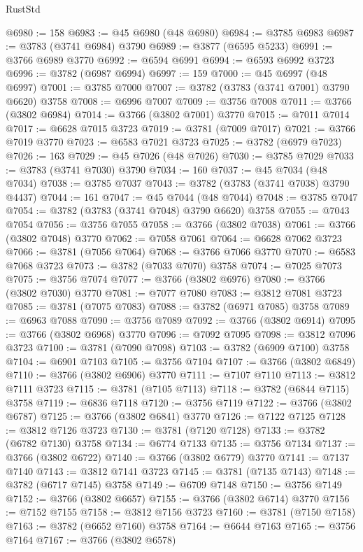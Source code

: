 \begin{lexlean}{RustStd}
\begin{coremodule}
@6980 := 158
@6983 := @45 @6980 (@48 @6980)
@6984 := @3785 @6983
@6987 := @3783 (@3741 @6984) @3790
@6989 := @3877 (@6595 @5233)
@6991 := @3766 @6989 @3770
@6992 := @6594 @6991
@6994 := @6593 @6992 @3723
@6996 := @3782 (@6987 @6994)
@6997 := 159
@7000 := @45 @6997 (@48 @6997)
@7001 := @3785 @7000
@7007 := @3782 (@3783 (@3741 @7001) @3790 @6620) @3758
@7008 := @6996 @7007
@7009 := @3756 @7008
@7011 := @3766 (@3802 @6984)
@7014 := @3766 (@3802 @7001) @3770
@7015 := @7011 @7014
@7017 := @6628 @7015 @3723
@7019 := @3781 (@7009 @7017)
@7021 := @3766 @7019 @3770
@7023 := @6583 @7021 @3723
@7025 := @3782 (@6979 @7023)
@7026 := 163
@7029 := @45 @7026 (@48 @7026)
@7030 := @3785 @7029
@7033 := @3783 (@3741 @7030) @3790
@7034 := 160
@7037 := @45 @7034 (@48 @7034)
@7038 := @3785 @7037
@7043 := @3782 (@3783 (@3741 @7038) @3790 @4437)
@7044 := 161
@7047 := @45 @7044 (@48 @7044)
@7048 := @3785 @7047
@7054 := @3782 (@3783 (@3741 @7048) @3790 @6620) @3758
@7055 := @7043 @7054
@7056 := @3756 @7055
@7058 := @3766 (@3802 @7038)
@7061 := @3766 (@3802 @7048) @3770
@7062 := @7058 @7061
@7064 := @6628 @7062 @3723
@7066 := @3781 (@7056 @7064)
@7068 := @3766 @7066 @3770
@7070 := @6583 @7068 @3723
@7073 := @3782 (@7033 @7070) @3758
@7074 := @7025 @7073
@7075 := @3756 @7074
@7077 := @3766 (@3802 @6976)
@7080 := @3766 (@3802 @7030) @3770
@7081 := @7077 @7080
@7083 := @3812 @7081 @3723
@7085 := @3781 (@7075 @7083)
@7088 := @3782 (@6971 @7085) @3758
@7089 := @6963 @7088
@7090 := @3756 @7089
@7092 := @3766 (@3802 @6914)
@7095 := @3766 (@3802 @6968) @3770
@7096 := @7092 @7095
@7098 := @3812 @7096 @3723
@7100 := @3781 (@7090 @7098)
@7103 := @3782 (@6909 @7100) @3758
@7104 := @6901 @7103
@7105 := @3756 @7104
@7107 := @3766 (@3802 @6849)
@7110 := @3766 (@3802 @6906) @3770
@7111 := @7107 @7110
@7113 := @3812 @7111 @3723
@7115 := @3781 (@7105 @7113)
@7118 := @3782 (@6844 @7115) @3758
@7119 := @6836 @7118
@7120 := @3756 @7119
@7122 := @3766 (@3802 @6787)
@7125 := @3766 (@3802 @6841) @3770
@7126 := @7122 @7125
@7128 := @3812 @7126 @3723
@7130 := @3781 (@7120 @7128)
@7133 := @3782 (@6782 @7130) @3758
@7134 := @6774 @7133
@7135 := @3756 @7134
@7137 := @3766 (@3802 @6722)
@7140 := @3766 (@3802 @6779) @3770
@7141 := @7137 @7140
@7143 := @3812 @7141 @3723
@7145 := @3781 (@7135 @7143)
@7148 := @3782 (@6717 @7145) @3758
@7149 := @6709 @7148
@7150 := @3756 @7149
@7152 := @3766 (@3802 @6657)
@7155 := @3766 (@3802 @6714) @3770
@7156 := @7152 @7155
@7158 := @3812 @7156 @3723
@7160 := @3781 (@7150 @7158)
@7163 := @3782 (@6652 @7160) @3758
@7164 := @6644 @7163
@7165 := @3756 @7164
@7167 := @3766 (@3802 @6578)

\end{coremodule}
\end{lexlean}
